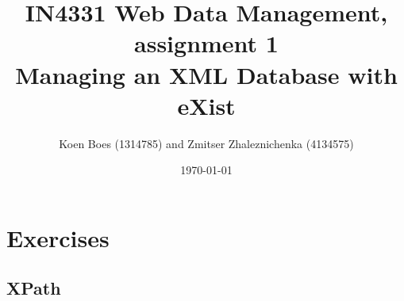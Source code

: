 \documentclass[a4paper, notitlepage]{article}
\begin{document}
\title{IN4331 Web Data Management, assignment 1 \\
Managing an XML Database with eXist}
\author{Koen Boes (1314785) and Zmitser Zhaleznichenka (4134575)}
\date{\today}
\maketitle

\setcounter{secnumdepth}{0}

\section{Exercises}

\subsection{XPath}
\end{document}
